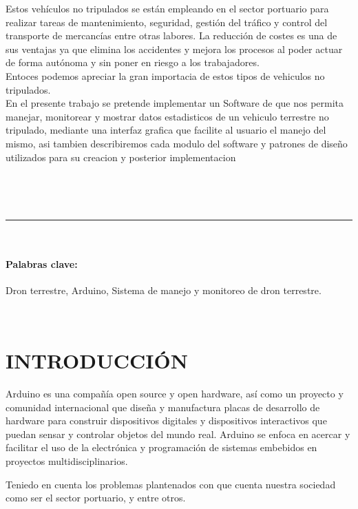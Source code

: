 \documentclass[letterpaper,12pt]{article}
\begin{document}
{	Estos vehículos no tripulados se están empleando en el sector portuario para realizar tareas de mantenimiento, seguridad, gestión del tráfico y control del transporte de mercancías entre otras labores. La reducción de costes es una de sus ventajas ya que elimina los accidentes y mejora los procesos al poder actuar de forma autónoma y sin poner en riesgo a los trabajadores.\\
	
	Entoces podemos apreciar la gran importacia de estos tipos de vehiculos no tripulados.\\
	
	En el presente trabajo se pretende implementar un Software de que nos permita manejar, monitorear y mostrar datos estadisticos de un vehiculo terrestre no tripulado, mediante una interfaz grafica que facilite al usuario el manejo del mismo, asi tambien describiremos cada modulo del software y patrones de diseño  utilizados para su creacion y posterior implementacion
	
	

\vspace{1cm}
\ %

\
\hrule
\
\

\paragraph{Palabras clave:} Dron terrestre, Arduino, Sistema de manejo y monitoreo de dron terrestre.

\
\newpage
\tableofcontents
\newpage



\section{INTRODUCCIÓN}
\vspace{1.5cm}

Arduino es una compañía open source y open hardware, así como un proyecto y comunidad internacional que diseña y manufactura placas de desarrollo de hardware para construir dispositivos digitales y dispositivos interactivos que puedan sensar y controlar objetos del mundo real.
Arduino se enfoca en acercar y facilitar el uso de la electrónica y programación de sistemas embebidos en proyectos multidisciplinarios.

Teniedo en cuenta los problemas plantenados con que cuenta nuestra sociedad como ser el sector portuario, y entre otros.

}
\end{document}
